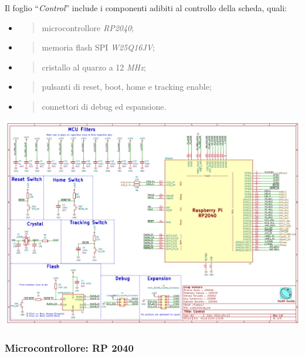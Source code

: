 Il foglio ``\emph{Control}'' include i componenti adibiti al controllo
della scheda, quali:

\begin{itemize}
\item
  \begin{quote}
  microcontrollore \emph{RP2040};
  \end{quote}
\item
  \begin{quote}
  memoria flash SPI \emph{W25Q16JV};
  \end{quote}
\item
  \begin{quote}
  cristallo al quarzo a 12 \emph{MHz};
  \end{quote}
\item
  \begin{quote}
  pulsanti di reset, boot, home e tracking enable;
  \end{quote}
\item
  \begin{quote}
  connettori di debug ed espansione.
  \end{quote}
\end{itemize}

\begin{center}
\includegraphics[scale=0.5]{figures/image40.png}
\captionsetup{type=figure}
\end{center}

\hypertarget{microcontrollore-rp-2040}{%
\subsubsection{\texorpdfstring{\hfill\break
Microcontrollore: RP
2040}{ Microcontrollore: RP 2040}}\label{microcontrollore-rp-2040}}

